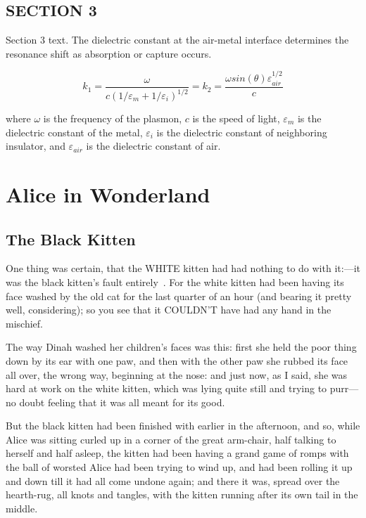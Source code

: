 \documentclass[phd,tocprelim]{cornell}
\begin{document}
\section{SECTION 3}
Section 3 text. The dielectric constant at the air-metal interface
determines the resonance shift as absorption or capture occurs.

\begin{equation}
k_1=\frac{\omega }{c({1/\varepsilon_m + 1/\varepsilon_i})^{1/2}}=k_2=\frac{\omega
sin(\theta)\varepsilon_{air}^{1/2}}{c}
\end{equation}

\noindent
where $\omega$ is the frequency of the plasmon, $c$ is the speed of
light, $\varepsilon_m$ is the dielectric constant of the metal,
$\varepsilon_i$ is the dielectric constant of neighboring insulator,
and $\varepsilon_{air}$ is the dielectric constant of air.

\chapter{Alice in Wonderland}

\section{The Black Kitten}
  One thing was certain, that the WHITE kitten had had nothing to
do with it:---it was the black kitten's fault entirely~\cite{aiw}.  For the
white kitten had been having its face washed by the old cat for
the last quarter of an hour (and bearing it pretty well,
considering); so you see that it COULDN'T have had any hand in
the mischief.

  The way Dinah washed her children's faces was this:  first she
held the poor thing down by its ear with one paw, and then with
the other paw she rubbed its face all over, the wrong way,
beginning at the nose:  and just now, as I said, she was hard at
work on the white kitten, which was lying quite still and trying
to purr---no doubt feeling that it was all meant for its good.

  But the black kitten had been finished with earlier in the
afternoon, and so, while Alice was sitting curled up in a corner
of the great arm-chair, half talking to herself and half asleep,
the kitten had been having a grand game of romps with the ball of
worsted Alice had been trying to wind up, and had been rolling it
up and down till it had all come undone again; and there it was,
spread over the hearth-rug, all knots and tangles, with the
kitten running after its own tail in the middle.
\end{document}
